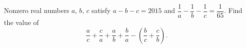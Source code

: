 Nonzero real numbers $a$, $b$, $c$ satisfy $a-b-c=2015$ and $\dfrac{1}{a}-\dfrac{1}{b}-\dfrac{1}{c}=\dfrac{1}{65}$. Find the value of
\[
\dfrac {a}{c}+\dfrac {c}{a}+\dfrac {a}{b}+\dfrac {b}{a}-\left(\dfrac {b}{c}+\dfrac {c}{b}\right).
\]
